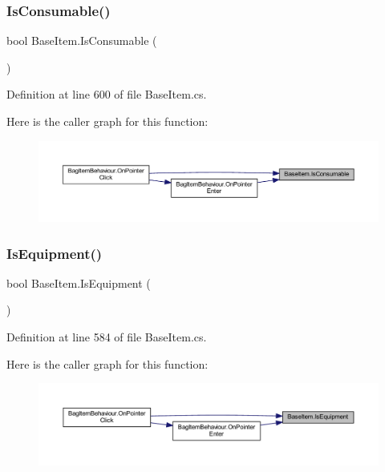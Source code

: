 \subsubsection{\texorpdfstring{IsConsumable()}{IsConsumable()}}
{\footnotesize\ttfamily bool Base\+Item.\+Is\+Consumable (\begin{DoxyParamCaption}{ }\end{DoxyParamCaption})}



Definition at line 600 of file Base\+Item.\+cs.

Here is the caller graph for this function\+:
\nopagebreak
\begin{figure}[H]
\begin{center}
\leavevmode
\includegraphics[width=350pt]{class_base_item_a3888fc05b9a0589c098ed9a8c2f978f2_icgraph}
\end{center}
\end{figure}
\mbox{\label{class_base_item_a251c4cb0509ed9191a07057f8ea388c6}} 
\subsubsection{\texorpdfstring{IsEquipment()}{IsEquipment()}}
{\footnotesize\ttfamily bool Base\+Item.\+Is\+Equipment (\begin{DoxyParamCaption}{ }\end{DoxyParamCaption})}



Definition at line 584 of file Base\+Item.\+cs.

Here is the caller graph for this function\+:
\nopagebreak
\begin{figure}[H]
\begin{center}
\leavevmode
\includegraphics[width=350pt]{class_base_item_a251c4cb0509ed9191a07057f8ea388c6_icgraph}
\end{center}
\end{figure}
\mbox{\label{class_base_item_ad59a505bcfb8a026519ca912d0c1d8d3}} 
